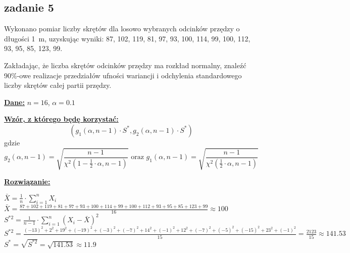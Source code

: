 \subsection{zadanie 5}
Wykonano pomiar liczby skrętów dla losowo wybranych odcinków przędzy o długości 1~m, uzyskując wyniki: 87, 102, 119, 81, 97, 93, 100, 114, 99, 100, 112, 93, 95, 85, 123, 99.

Zakładając, że liczba skrętów odcinków  przędzy ma rozkład normalny, znaleźć 90\%-owe realizacje przedziałów ufności wariancji i odchylenia standardowego liczby skrętów całej partii przędzy. 



\textbf{\underline{Dane:}} $n = 16$, $\alpha = 0.1$
\newline

\textbf{\underline{Wzór, z którego będę korzystać:}}
$$
\left(
g_1(\alpha,n-1) \cdot S^{*},
g_2(\alpha,n-1) \cdot S^{*}
\right)
$$
gdzie 
$$
g_2(\alpha,n-1)=\sqrt{\frac{n-1}{\chi^2(1-\frac{1}{2} \cdot \alpha, n-1)}} \mbox{ oraz } g_1(\alpha,n-1)=\sqrt{\frac{n-1}{\chi^2(\frac{1}{2} \cdot \alpha, n-1)}}
$$

\textbf{\underline{Rozwiązanie:}}
\begin{flushleft}
$\bar X = \frac{1}{n}  \cdot \sum_{i=1}^{n} X_{i} $ \newline \newline
$\bar X = \frac{87 + 102 + 119 + 81 + 97 + 93 + 100 + 114 + 99 + 100 + 112 + 93 + 95 + 85 + 123 + 99}{16} \approx 100 $ \newline \newline
$S^{*2} = \frac{1}{n-1}  \cdot \sum_{i=1}^{n} (X_{i} - \bar X)^{2}$   \newline \newline
$S^{*2} = \frac{(-13)^{2} + 2^{2} + 19^{2} + (-19)^{2} + (-3)^{2} + (-7)^{2} + 14^{2} + (-1)^{2} + 12^{2} + (-7)^{2} + (-5)^{2} + (-15)^{2} + 23^{2} + (-1)^{2}}{15} = \frac{2123}{15} \approx 141.53 $ \newline \newline
$S^{*} = \sqrt{S^{*2}} =\sqrt{141.53} \approx 11.9 $
\end{flushleft}


